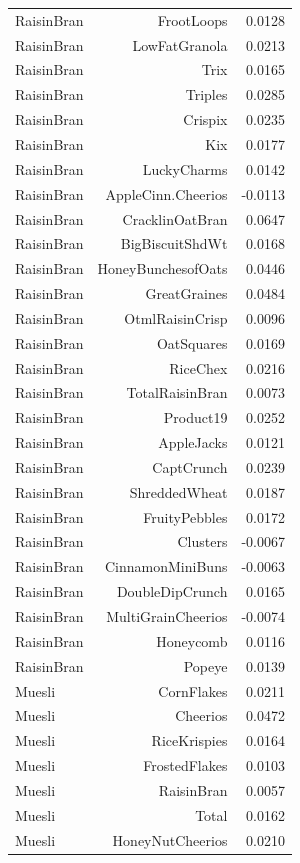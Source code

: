 \begin{longtable}{@{}lrr@{}}
RaisinBran & FrootLoops & 0.0128 \\
RaisinBran & LowFatGranola & 0.0213 \\
RaisinBran & Trix & 0.0165 \\
RaisinBran & Triples & 0.0285 \\
RaisinBran & Crispix & 0.0235 \\
RaisinBran & Kix & 0.0177 \\
RaisinBran & LuckyCharms & 0.0142 \\
RaisinBran & AppleCinn.Cheerios & -0.0113 \\
RaisinBran & CracklinOatBran & 0.0647 \\
RaisinBran & BigBiscuitShdWt & 0.0168 \\
RaisinBran & HoneyBunchesofOats & 0.0446 \\
RaisinBran & GreatGraines & 0.0484 \\
RaisinBran & OtmlRaisinCrisp & 0.0096 \\
RaisinBran & OatSquares & 0.0169 \\
RaisinBran & RiceChex & 0.0216 \\
RaisinBran & TotalRaisinBran & 0.0073 \\
RaisinBran & Product19 & 0.0252 \\
RaisinBran & AppleJacks & 0.0121 \\
RaisinBran & CaptCrunch & 0.0239 \\
RaisinBran & ShreddedWheat & 0.0187 \\
RaisinBran & FruityPebbles & 0.0172 \\
RaisinBran & Clusters & -0.0067 \\
RaisinBran & CinnamonMiniBuns & -0.0063 \\
RaisinBran & DoubleDipCrunch & 0.0165 \\
RaisinBran & MultiGrainCheerios & -0.0074 \\
RaisinBran & Honeycomb & 0.0116 \\
RaisinBran & Popeye & 0.0139 \\
Muesli & CornFlakes & 0.0211 \\
Muesli & Cheerios & 0.0472 \\
Muesli & RiceKrispies & 0.0164 \\
Muesli & FrostedFlakes & 0.0103 \\
Muesli & RaisinBran & 0.0057 \\
Muesli & Total & 0.0162 \\
Muesli & HoneyNutCheerios & 0.0210 \\

\end{longtable}
